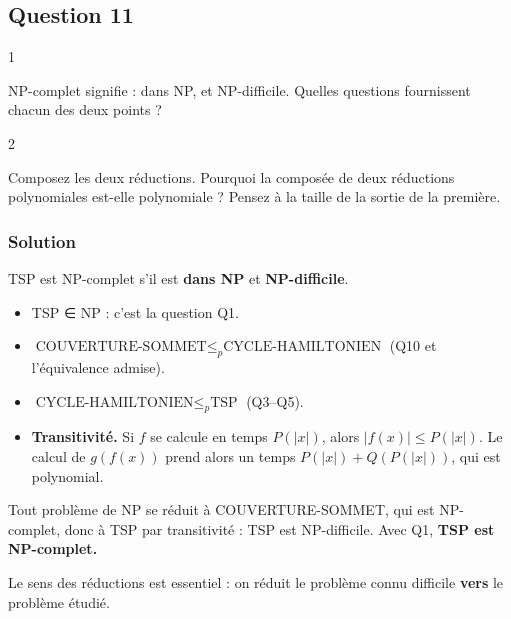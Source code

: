 \documentclass[11pt,a4paper]{article}
\providecommand{\tightlist}{\setlength{\itemsep}{0pt}\setlength{\parskip}{0pt}}
\begin{document}
\hypertarget{question-11}{%
\subsection{Question 11}\label{question-11}}

\begin{indication}{1}

NP-complet signifie : dans NP, et NP-difficile. Quelles questions fournissent chacun des deux points ?

\end{indication}

\begin{indication}{2}

Composez les deux réductions. Pourquoi la composée de deux réductions polynomiales est-elle polynomiale ? Pensez à la taille de la sortie de la première.

\end{indication}

\hypertarget{solution-10}{%
\subsubsection{Solution}\label{solution-10}}

TSP est NP-complet s'il est \textbf{dans NP} et \textbf{NP-difficile}.

\begin{itemize}
\tightlist
\item
  TSP ∈ NP : c'est la question Q1.
\item
  \(\text{COUVERTURE-SOMMET}\le_p\text{CYCLE-HAMILTONIEN}\) (Q10 et l'équivalence admise).
\item
  \(\text{CYCLE-HAMILTONIEN}\le_p\text{TSP}\) (Q3--Q5).
\item
  \textbf{Transitivité.} Si \(f\) se calcule en temps \(P(|x|)\), alors \(|f(x)|\le P(|x|)\). Le calcul de \(g(f(x))\) prend alors un temps \(P(|x|)+Q(P(|x|))\), qui est polynomial.
\end{itemize}

Tout problème de NP se réduit à COUVERTURE-SOMMET, qui est NP-complet, donc à TSP par transitivité : TSP est NP-difficile. Avec Q1, \textbf{TSP est NP-complet.}

\begin{piege}

Le sens des réductions est essentiel : on réduit le problème connu difficile \textbf{vers} le problème étudié.

\end{piege}
\end{document}
